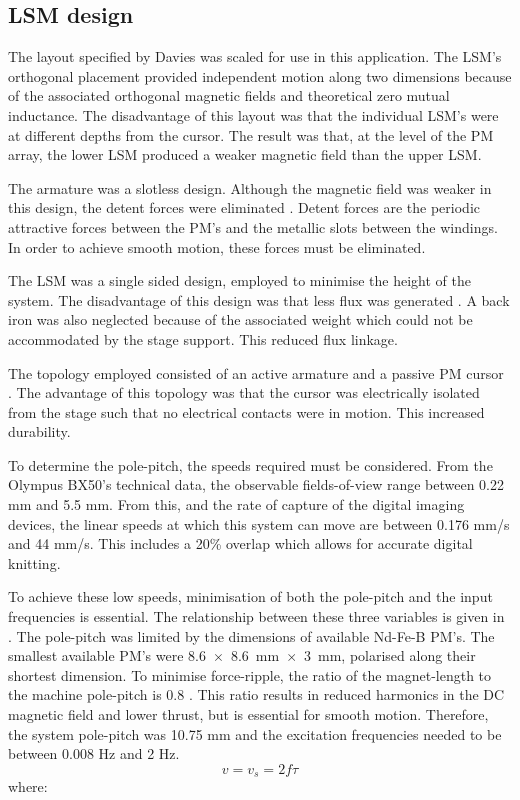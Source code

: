 \documentclass[10pt,twocolumn]{witseiepaper}
\begin{document}
\subsection{LSM design}

The layout specified by Davies \cite{Simon} was scaled for use in this
application.  The LSM's orthogonal placement provided independent motion along
two dimensions because of the associated orthogonal magnetic fields and
theoretical zero mutual inductance.  The disadvantage of this layout was that
the individual LSM's were at different depths from the cursor.  The result was
that, at the level of the PM array, the lower LSM produced a weaker magnetic
field than the upper LSM.

The armature was a slotless design.  Although the magnetic field was weaker in
this design, the detent forces were eliminated \cite{Tubular,XY-Thrust}.
Detent forces are the periodic attractive forces between the PM's and the
metallic slots between the windings.  In order to achieve smooth motion, these
forces must be eliminated.  

The LSM was a single sided design, employed to minimise the height of the
system.  The disadvantage of this design was that less flux was
generated \cite{Linsync}.  A back iron was also neglected because of the
associated weight which could not be accommodated by the stage support.  This
reduced flux linkage.

The topology employed consisted of an active armature and a passive PM
cursor \cite{Linsync}.  The advantage of this topology was that the cursor was
electrically isolated from the stage such that no electrical contacts were in
motion.  This increased durability.

To determine the pole-pitch, the speeds required must be considered.  From the
Olympus BX50's technical data, the observable fields-of-view range between
0.22 mm and 5.5 mm.  From this, and the rate of capture of the digital imaging
devices, the linear speeds at which this system can move are between 0.176
mm/s and 44 mm/s.  This includes a 20\% overlap which allows for accurate
digital knitting.

To achieve these low speeds, minimisation of both the pole-pitch and the input
frequencies is essential.  The relationship between these three variables is
given in .  The pole-pitch was limited by the dimensions of
available Nd-Fe-B PM's.  The smallest available PM's were \mbox{8.6 $\times$
8.6 mm $\times$ 3 mm}, polarised along their shortest dimension. To minimise
force-ripple, the ratio of the magnet-length to the machine pole-pitch is
0.8 \cite{Tubular}.  This ratio results in reduced harmonics in the DC magnetic
field and lower thrust, but is essential for smooth motion. Therefore, the
system pole-pitch was 10.75 mm and the excitation frequencies needed to be
between 0.008 Hz and 2 Hz.
\begin{equation}
	v = v_s = 2f\tau
	\label{eqn:Speed}
\end{equation}
where:
\end{document}

